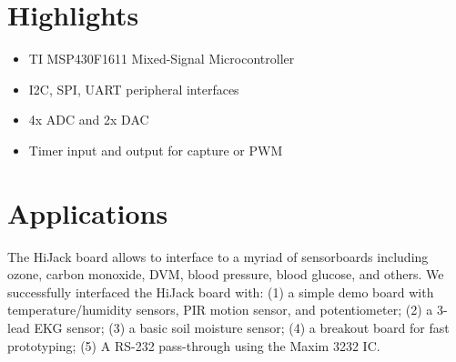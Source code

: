 \documentclass[10pt,letterpaper]{datasheet}
\begin{document}
\section*{Highlights}
\begin{multicols}{2}
\begin{itemize}
\item TI MSP430F1611 Mixed-Signal Microcontroller
\item I2C, SPI, UART peripheral interfaces
\item 4x ADC and 2x DAC
\item Timer input and output for capture or PWM
\end{itemize}
\end{multicols}


\section*{Applications}
\begin{multicols}{2}
The HiJack board allows to interface to a myriad of sensorboards including
ozone, carbon monoxide, DVM, blood pressure, blood glucose, and others.  We
successfully interfaced the HiJack board with: (1) a simple demo board with
temperature/humidity sensors, PIR motion sensor, and potentiometer; (2) a
3-lead EKG sensor; (3) a basic soil moisture sensor; (4) a breakout board for
fast prototyping; (5) A RS-232 pass-through using the Maxim 3232 IC.
\end{multicols}

\newpage
\end{document}
